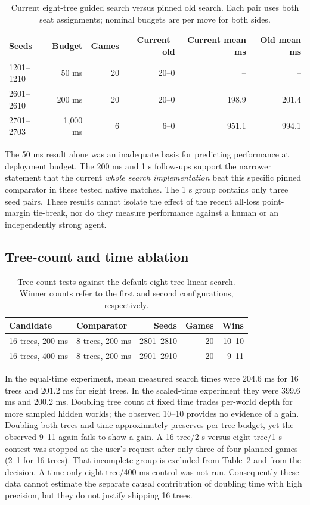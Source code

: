 \documentclass{article}
\begin{document}
\begin{table}[H]
\caption{Current eight-tree guided search versus pinned old search. Each pair uses both seat assignments; nominal budgets are per move for both sides.}
\label{tab:old}
\centering
\small
\begin{tabular}{lrrrrr}
\toprule
Seeds & Budget & Games & Current--old & Current mean ms & Old mean ms\\
\midrule
1201--1210 & 50 ms & 20 & 20--0 & -- & --\\
2601--2610 & 200 ms & 20 & 20--0 & 198.9 & 201.4\\
2701--2703 & 1{,}000 ms & 6 & 6--0 & 951.1 & 994.1\\
\bottomrule
\end{tabular}
\end{table}

The 50 ms result alone was an inadequate basis for predicting performance at deployment budget. The 200 ms and 1 s follow-ups support the narrower statement that the current \emph{whole search implementation} beat this specific pinned comparator in these tested native matches. The 1 s group contains only three seed pairs. These results cannot isolate the effect of the recent all-loss point-margin tie-break, nor do they measure performance against a human or an independently strong agent.

\subsection{Tree-count and time ablation}

\begin{table}[H]
\caption{Tree-count tests against the default eight-tree linear search. Winner counts refer to the first and second configurations, respectively.}
\label{tab:trees}
\centering
\small
\begin{tabular}{p{2.05in}p{1.35in}rrr}
\toprule
Candidate & Comparator & Seeds & Games & Wins\\
\midrule
16 trees, 200 ms & 8 trees, 200 ms & 2801--2810 & 20 & 10--10\\
16 trees, 400 ms & 8 trees, 200 ms & 2901--2910 & 20 & 9--11\\
\bottomrule
\end{tabular}
\end{table}

In the equal-time experiment, mean measured search times were 204.6 ms for 16 trees and 201.2 ms for eight trees. In the scaled-time experiment they were 399.6 ms and 200.2 ms. Doubling tree count at fixed time trades per-world depth for more sampled hidden worlds; the observed 10--10 provides no evidence of a gain. Doubling both trees and time approximately preserves per-tree budget, yet the observed 9--11 again fails to show a gain. A 16-tree/2 s versus eight-tree/1 s contest was stopped at the user's request after only three of four planned games (2--1 for 16 trees). That incomplete group is excluded from Table~\ref{tab:trees} and from the decision. A time-only eight-tree/400 ms control was not run. Consequently these data cannot estimate the separate causal contribution of doubling time with high precision, but they do not justify shipping 16 trees.
\end{document}
